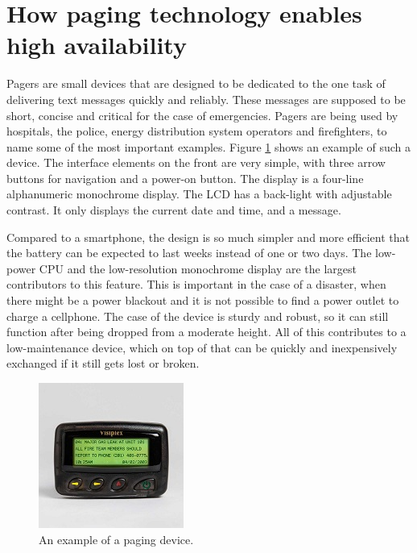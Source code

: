 \documentclass{CML_Seminar_Template}
\begin{document}


\section{How paging technology enables high availability}
Pagers are small devices that are designed to be dedicated to the one task of delivering text messages quickly and reliably. These messages are supposed to be short, concise and critical for the case of emergencies. Pagers are being used by hospitals, the police, energy distribution system operators and firefighters, to name some of the most important examples. Figure \ref{pager_fig1} shows an example of such a device. The interface elements on the front are very simple, with three arrow buttons for navigation and a power-on button. The display is a four-line alphanumeric monochrome display. The LCD has a back-light with adjustable contrast. It only displays the current date and time, and a message.
\par
Compared to a smartphone, the design is so much simpler and more efficient that the battery can be expected to last weeks instead of one or two days. The low-power CPU and the low-resolution monochrome display are the largest contributors to this feature. This is important in the case of a disaster, when there might be a power blackout and it is not possible to find a power outlet to charge a cellphone. The case of the device is sturdy and robust, so it can still function after being dropped from a moderate height. All of this contributes to a low-maintenance device, which on top of that can be quickly and inexpensively exchanged if it still gets lost or broken.

\begin{figure}[htb]
  \begin{center}
   \includegraphics{pager_small.jpg}
  \end{center}
    \caption{\label{pager_fig1} An example of a paging device.}
\end{figure}
\end{document}
